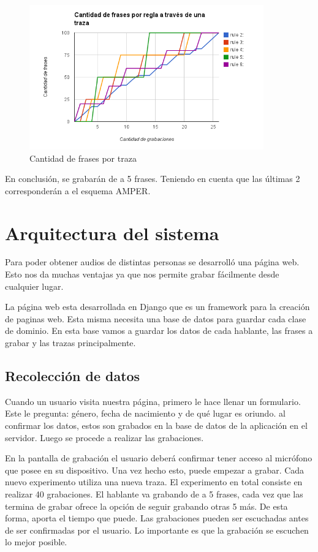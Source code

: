 \documentclass[11pt,a4paper,twoside]{tesis}
\begin{document}

\begin{figure}[h!]
    \centerline{\includegraphics[width=0.9\textwidth]{cant_frases_traza_inf} }
    \caption{Cantidad de frases por traza}
\end{figure}

En conclusión, se grabarán de a 5 frases. Teniendo en cuenta que las últimas 2 corresponderán a el esquema AMPER. 

\chapter{Arquitectura del sistema}

Para poder obtener audios de distintas personas se desarrolló una página web. Esto nos da muchas ventajas ya que nos permite grabar fácilmente desde cualquier lugar.  

La página web esta desarrollada en Django que es un framework para la creación de paginas web. Esta misma necesita una base de datos para guardar cada clase de dominio. En esta base vamos a guardar los datos de cada hablante, las frases a grabar y las trazas principalmente.

\section{Recolección de datos}

Cuando un usuario visita nuestra página, primero le hace llenar un formulario. Este le pregunta: género, fecha de nacimiento y de qué lugar es oriundo. al confirmar los datos, estos son grabados en la base de datos de la aplicación en el servidor. Luego se procede a realizar las grabaciones. 

En la pantalla de grabación el usuario deberá confirmar tener acceso al micrófono que posee en su dispositivo. Una vez hecho esto, puede empezar a grabar. Cada nuevo experimento utiliza una nueva traza. El experimento en total consiste en realizar 40 grabaciones. El hablante va grabando de a 5 frases, cada vez que las termina de grabar ofrece la opción de seguir grabando otras 5 más. De esta forma, aporta el tiempo que puede. Las grabaciones pueden ser escuchadas antes de ser confirmadas por el usuario. Lo importante es que la grabación se escuchen lo mejor posible.
\end{document}
